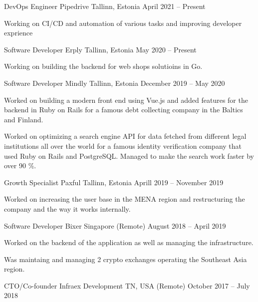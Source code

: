 \documentclass[]{awesome-cv}
\begin{document}
\vspace{-7mm}
\begin{cventries}
        \cventry
       {DevOps Engineer}
        {Pipedrive}
        {Tallinn, Estonia}
        {April 2021 – Present}
        {\begin{cvitems}
                \item {Working on CI/CD and automation of various tasks and improving developer exprience}
                \end{cvitems}}
	\cventry
	{Software Developer}
	{Erply}
	{Tallinn, Estonia}
	{May 2020 – Present}
	{\begin{cvitems}
		\item {Working on building the backend for web shops solutioins in Go.}
		\end{cvitems}}
	\cventry
	{Software Developer}
	{Mindly}
	{Tallinn, Estonia}
	{December 2019 – May 2020}
	{\begin{cvitems}
		\item {Worked on building a modern front end using Vue.js and added features for the backend in Ruby on Rails for a famous debt collecting company in the Baltics and Finland.}
		\item {Worked on optimizing a search engine API for data fetched from different legal institutions all over the world for a famous identity verification company that used Ruby on Rails and PostgreSQL. Managed to make the search work faster by over 90 \%.}
		\end{cvitems}}
	\cventry
	{Growth Specialist}
	{Paxful}
	{Tallinn, Estonia}
	{Aprill 2019 – November 2019}
	{\begin{cvitems}
		\item {Worked on increasing the user base in the MENA region and restructuring the company and the way it works internally.}
		\end{cvitems}}
	\cventry
	{Software Developer}
	{Bixer}
	{Singapore (Remote)}
	{August 2018 – April 2019}
	{\begin{cvitems}
		\item {Worked on the backend of the application as well as managing the infrastructure.}
		\item {Was maintaing and managing 2 crypto exchanges operating the Southeast Asia region.}
		\end{cvitems}}
	\cventry
	{CTO/Co-founder}
	{Infraex Development}
	{TN, USA (Remote)}
	{October 2017 – July 2018}

\end{cventries}
\end{document}
